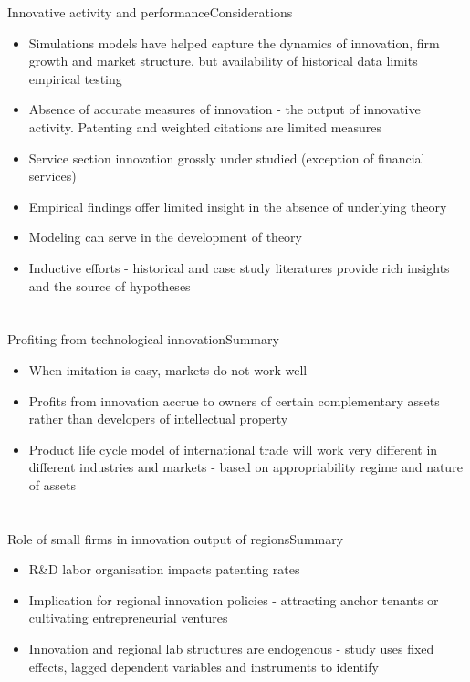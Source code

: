 \documentclass{beamer}
\begin{document}
\begin{frame}{Innovative activity and performance}{Considerations}
\begin{itemize}
\item{Simulations models have helped capture the dynamics of innovation, firm growth and market structure, but availability of historical data limits empirical testing}
\item{Absence of accurate measures of innovation - the output of innovative activity. Patenting and weighted citations are limited measures}
\item{Service section innovation grossly under studied (exception of financial services)}
\item{Empirical findings offer limited insight in the absence of underlying theory}
\item{Modeling can serve in the development of theory}
\item{Inductive efforts - historical and case study literatures provide rich insights and the source of hypotheses}
\end{itemize}
\end{frame}

\section{\cite{Teece1986}}
\begin{frame}{Profiting from technological innovation}{Summary}
\begin{itemize}
\item{When imitation is easy, markets do not work well}
\item{Profits from innovation accrue to owners of certain complementary assets rather than developers of intellectual property}
\item{Product life cycle model of international trade will work very different in different industries and markets - based on appropriability regime and nature of assets}
\end{itemize}
\end{frame}



\section{\cite{Agrawal2014}}
\begin{frame}{Role of small firms in innovation output of regions}{Summary}
\begin{itemize}
\item{R\&D labor organisation impacts patenting rates}
\item{Implication for regional innovation policies - attracting anchor tenants or cultivating entrepreneurial ventures}
\item{Innovation and regional lab structures are endogenous - study uses fixed effects, lagged dependent variables and instruments to identify}
\end{itemize}
\end{frame}
\end{document}
